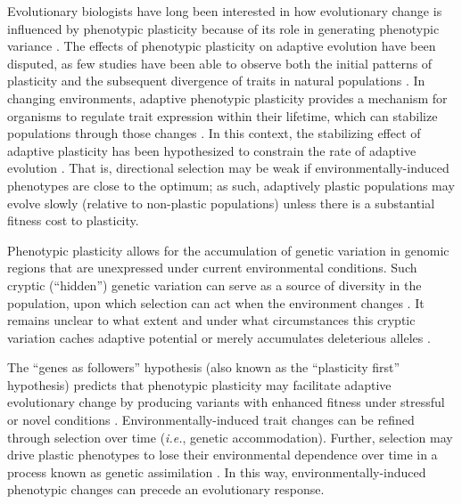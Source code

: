 Evolutionary biologists have long been interested in how evolutionary change is influenced by phenotypic plasticity because of its role in generating phenotypic variance \citep{gibert_phenotypic_2019}.
The effects of phenotypic plasticity on adaptive evolution have been disputed, as few studies have been able to observe both the initial patterns of plasticity and the subsequent divergence of traits in natural populations \citep{ghalambor_adaptive_2007,wund_assessing_2012,forsman_rethinking_2015,ghalambor_non-adaptive_2015,hendry_key_2016}.
In changing environments, adaptive phenotypic plasticity provides a mechanism for organisms to regulate trait expression within their lifetime, which can stabilize populations through those changes \citep{gibert_phenotypic_2019}.
In this context, the stabilizing effect of adaptive plasticity has been hypothesized to constrain the rate of adaptive evolution \citep{gupta_study_1982,ancel_undermining_2000,huey_behavioral_2003,price_role_2003,paenke_influence_2007}.
That is, directional selection may be weak if environmentally-induced phenotypes are close to the optimum; as such, adaptively plastic populations may evolve slowly (relative to non-plastic populations) unless there is a substantial fitness cost to plasticity.



Phenotypic plasticity allows for the accumulation of genetic variation in genomic regions that are unexpressed under current environmental conditions.
Such cryptic (``hidden'') genetic variation can serve as a source of diversity in the population, upon which selection can act when the environment changes \citep{schlichting_hidden_2008,levis_evaluating_2016}.
It remains unclear to what extent and under what circumstances this cryptic variation caches adaptive potential or merely accumulates deleterious alleles \citep{gibson_uncovering_2004,paaby_cryptic_2014,zheng_cryptic_2019}.

The ``genes as followers'' hypothesis (also known as the ``plasticity first'' hypothesis) predicts that phenotypic plasticity may facilitate adaptive evolutionary change by producing variants with enhanced fitness under stressful or novel conditions \citep{west-eberhard_developmental_2003,schwander_genes_2011,levis_evaluating_2016}.
Environmentally-induced trait changes can be refined through selection over time (\textit{i.e.}, genetic accommodation).
Further, selection may drive plastic phenotypes to lose their environmental dependence over time in a process known as genetic assimilation \citep{west-eberhard_developmental_2005,pigliucci_phenotypic_2006,crispo_baldwin_2007,schlichting_phenotypic_2014,levis_evaluating_2016}.
In this way, environmentally-induced phenotypic changes can precede an evolutionary response.


